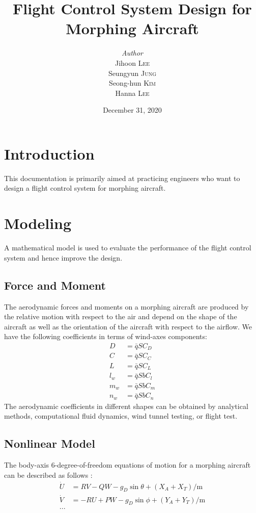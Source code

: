 \documentclass[a4paper, 12pt]{report}
\institute{Seoul National University}
\title{Flight Control System Design for Morphing Aircraft}
\author{\textit{Author}\\Jihoon \textsc{Lee}\\Seungyun \textsc{Jung}\\Seong-hun \textsc{Kim}\\Hanna \textsc{Lee}}
\date{December 31, 2020}
\begin{document}
    \maketitle
    \romantableofcontents

    \chapter{Introduction}

    This documentation is primarily aimed at practicing engineers who want to design a flight control system for morphing aircraft.

	\chapter{Modeling}

	A mathematical model is used to evaluate the performance of the flight control system and hence improve the design.
	
	\section{Force and Moment}
	
	The aerodynamic forces and moments on a morphing aircraft are produced by the relative motion with respect to the air and depend on the shape of the aircraft as well as the orientation of the aircraft with respect to the airflow.
	We have the following coefficients in terms of wind-axes components:
	\begin{align}
		D &= \bar{q}SC_D \\
		C &= \bar{q}SC_C \\
		L &= \bar{q}SC_L \\
		l_w &= \bar{q}SbC_l \\
		m_w &= \bar{q}SbC_m \\
		n_w &= \bar{q}SbC_n
	\end{align}
	The aerodynamic coefficients in different shapes can be obtained by analytical methods, computational fluid dynamics, wind tunnel testing, or flight test.
	
	\section{Nonlinear Model}
	
	The body-axis 6-degree-of-freedom equations of motion for a morphing aircraft can be described as follows \cite{stevens2015aircraft}:
	\begin{align}
		\dot{U} &= RV-QW-g_D\sin\theta+(X_A+X_T)/\text{m} \\
		\dot{V} &= -RU+PW-g_D\sin\phi+(Y_A+Y_T)/\text{m} \\
		...
	\end{align}
	
\end{document}
